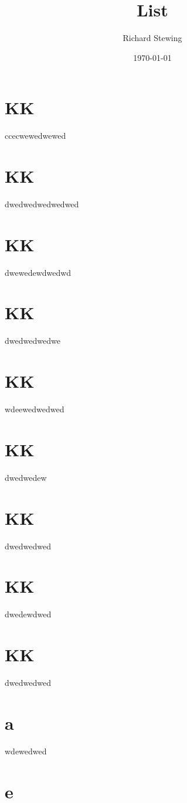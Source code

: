 \documentclass[a4paper]{article}
\author{Richard Stewing}
\date{\today}
\title{List}
\begin{document}
\maketitle
\tableofcontents

\pagestyle{fancy}
\fancyhf{}




\section{KK}
\label{sec:org16925d9}
ccecwewedwewed
\section{KK}
\label{sec:org839a660}
dwedwedwedwedwed
\section{KK}
\label{sec:org78add84}
dwewedewdwedwd
\section{KK}
\label{sec:orgfce75b9}
dwedwedwedwe
\section{KK}
\label{sec:orgaf4f63e}
wdeewedwedwed
\section{KK}
\label{sec:org9c63290}
dwedwedew
\section{KK}
\label{sec:org627f00d}
dwedwedwed
\section{KK}
\label{sec:orgfab77b8}
dwedewdwed
\section{KK}
\label{sec:orga4a76d9}
dwedwedwed
\section{a}
\label{sec:orgd015543}
wdewedwed
\section{e}
\label{sec:orgd732df6}
\end{document}
